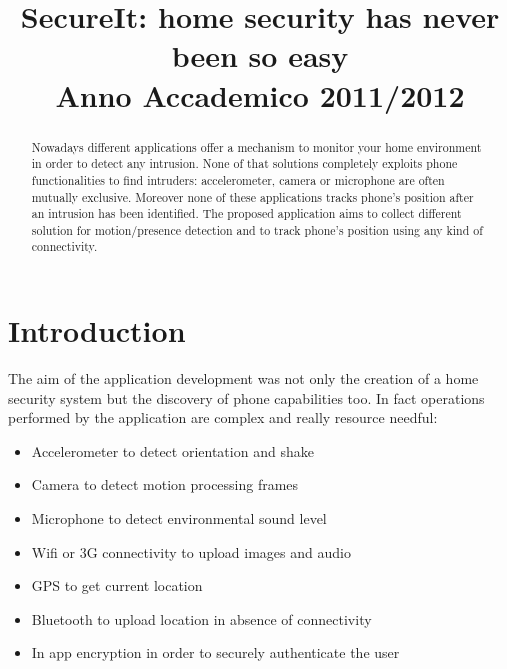 \documentclass[conference]{IEEEtran}
\begin{document}
\title{SecureIt: home security has never been so easy\\
Anno Accademico 2011/2012}

\author{
}


\maketitle


\begin{abstract}
Nowadays different applications offer a mechanism to monitor your home environment in order to detect any intrusion. None of that solutions completely exploits phone functionalities to find intruders: accelerometer, camera or microphone are often mutually exclusive. Moreover none of these applications tracks phone's position after an intrusion has been identified. The proposed application aims to collect different solution for motion/presence detection and to track phone's position using any kind of connectivity.
\end{abstract}

\IEEEpeerreviewmaketitle

\section{\textbf{Introduction}}

The aim of the application development was not only the creation of a home security system but the discovery of phone capabilities too. In fact operations performed by the application are complex and really resource needful:
\begin{itemize}
	\item Accelerometer to detect orientation and shake
	\item Camera to detect motion processing frames
	\item Microphone to detect environmental sound level
	\item Wifi or 3G connectivity to upload images and audio
	\item GPS to get current location
	\item Bluetooth to upload location in absence of connectivity
	\item In app encryption in order to securely authenticate the user
\end{itemize}
\end{document}
